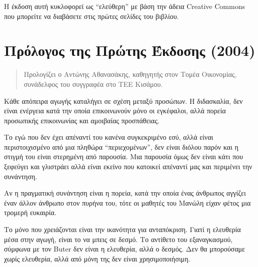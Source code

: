 Η έκδοση αυτή κυκλοφορεί ως ``ελεύθερη'' με βάση την άδεια Creative Commons
που μπορείτε να διαβάσετε στις πρώτες σελίδες του βιβλίου.

\section*{Πρόλογος της  Πρώτης Έκδοσης (2004)} 
\begin{quote}
Προλογίζει ο Αντώνης Αθανασάκης, καθηγητής στον Τομέα Οικονομίας, συνάδελφος του συγγραφέα στο ΤΕΕ Κισάμου.
\end{quote}
Κάθε απόπειρα αγωγής καταλήγει σε σχέση μεταξύ προσώπων. Η διδασκαλία, δεν είναι ενέργεια κατά την οποία επικοινωνούν μόνο οι εγκέφαλοι, αλλά πορεία προσωπικής επικοινωνίας και αμοιβαίας προσπάθειας. 

Το εγώ που δεν έχει απέναντί του κανένα συγκεκριμένο εσύ, αλλά είναι περιστοιχισμένο από μια πληθώρα ``περιεχομένων'', δεν είναι διόλου παρόν και η στιγμή του είναι στερημένη από παρουσία. Μια παρουσία όμως δεν είναι κάτι που ξεφεύγει και γλιστράει αλλά είναι εκείνο που κατοικεί απέναντί μας και περιμένει την συνάντηση. 

Αν η πραγματική συνάντηση είναι η πορεία, κατά την οποία ένας άνθρωπος αγγίζει έναν άλλον άνθρωπο στον πυρήνα του, τότε οι μαθητές του Μανώλη είχαν φέτος μια τρομερή ευκαιρία.

Το μόνο που χρειάζονται είναι την ικανότητα για ανταπόκριση. Γιατί η ελευθερία μέσα στην αγωγή, είναι το να μπεις σε δεσμό. Το αντίθετο του εξαναγκασμού, σύμφωνα με τον Buter δεν είναι η ελευθερία, αλλά ο δεσμός. Δεν θα μπορούσαμε χωρίς ελευθερία, αλλά από μόνη της δεν είναι χρησιμοποιήσιμη.
\newpage
\tableofcontents
\listoffigures
